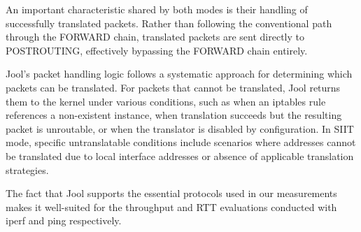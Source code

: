 An important characteristic shared by both modes is their handling of successfully translated packets. Rather than following the conventional path through the FORWARD chain, translated packets are sent directly to POSTROUTING, effectively bypassing the FORWARD chain entirely\cite{jool_introduction}.

Jool's packet handling logic follows a systematic approach for determining which packets can be translated. For packets that cannot be translated, Jool returns them to the kernel under various conditions, such as when an iptables rule references a non-existent instance, when translation succeeds but the resulting packet is unroutable, or when the translator is disabled by configuration\cite{jool_introduction}. In SIIT mode, specific untranslatable conditions include scenarios where addresses cannot be translated due to local interface addresses or absence of applicable translation strategies\cite{jool_introduction}.

The fact that Jool supports the essential protocols used in our measurements makes it well-suited for the throughput and RTT evaluations conducted with iperf and ping respectively\cite{jool_introduction}.

